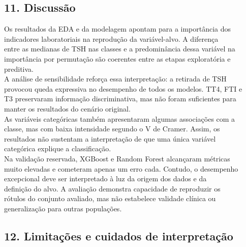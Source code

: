 \documentclass{article}
\begin{document}
\subsection{11. Discussão}

Os resultados da EDA e da modelagem apontam para a importância dos \\
indicadores laboratoriais na reprodução da variável-alvo. A diferença \\
entre as medianas de TSH nas classes e a predominância dessa variável na \\
importância por permutação são coerentes entre as etapas exploratória e \\
preditiva. \\

A análise de sensibilidade reforça essa interpretação: a retirada de TSH \\
provocou queda expressiva no desempenho de todos os modelos. TT4, FTI e \\
T3 preservaram informação discriminativa, mas não foram suficientes para \\
manter os resultados do cenário original. \\

As variáveis categóricas também apresentaram algumas associações com a \\
classe, mas com baixa intensidade segundo o V de Cramer. Assim, os \\
resultados não sustentam a interpretação de que uma única variável \\
categórica explique a classificação. \\

Na validação reservada, XGBoost e Random Forest alcançaram métricas \\
muito elevadas e cometeram apenas um erro cada. Contudo, o desempenho \\
excepcional deve ser interpretado à luz da origem dos dados e da \\
definição do alvo. A avaliação demonstra capacidade de reproduzir os \\
rótulos do conjunto avaliado, mas não estabelece validade clínica ou \\
generalização para outras populações. \\

\subsection{12. Limitações e cuidados de interpretação}
\end{document}
